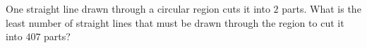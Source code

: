 One straight line drawn through a circular region cuts it into $2$ parts. What is the least number of straight lines that must be drawn through the region to cut it into $407$ parts?
